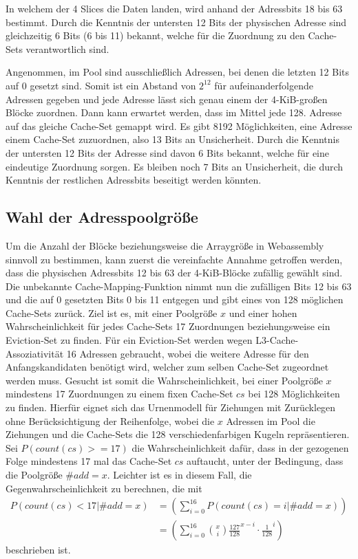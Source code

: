 In welchem der 4 Slices die Daten landen, wird anhand der Adressbits 18 bis 63 bestimmt.
Durch die Kenntnis der untersten 12 Bits der physischen Adresse sind gleichzeitig 6 Bits (6 bis 11) bekannt, welche für die Zuordnung zu den Cache-Sets verantwortlich sind.

Angenommen, im Pool sind ausschließlich Adressen, bei denen die letzten 12 Bits auf 0 gesetzt sind. 
Somit ist ein Abstand von $2^{12}$ für aufeinanderfolgende Adressen gegeben und jede Adresse lässt sich genau einem der 4-KiB-großen Blöcke zuordnen.
Dann kann erwartet werden, dass im Mittel jede 128. 
Adresse auf das gleiche Cache-Set gemappt wird. Es gibt 8192 Möglichkeiten, eine Adresse einem Cache-Set zuzuordnen, also 13 Bits an Unsicherheit.
Durch die Kenntnis der untersten 12 Bits der Adresse sind davon 6 Bits bekannt, welche für eine eindeutige Zuordnung sorgen. 
Es bleiben noch 7 Bits an Unsicherheit, die durch Kenntnis der restlichen Adressbits beseitigt werden könnten.

\subsection{Wahl der Adresspoolgröße}
\label{addressPoolSize}

Um die Anzahl der Blöcke beziehungsweise die Arraygröße in Webassembly sinnvoll zu bestimmen, kann zuerst die vereinfachte Annahme getroffen werden, dass die physischen Adressbits 12 bis 63 der 4-KiB-Blöcke zufällig gewählt sind. 
Die unbekannte Cache-Mapping-Funktion nimmt nun die zufälligen Bits 12 bis 63 und die auf 0 gesetzten Bits 0 bis 11 entgegen und gibt eines von 128 möglichen Cache-Sets zurück.
Ziel ist es, mit einer Poolgröße $x$ und einer hohen Wahrscheinlichkeit für jedes Cache-Sets 17 Zuordnungen beziehungsweise ein Eviction-Set zu finden.
Für ein Eviction-Set werden wegen L3-Cache-Assoziativität 16 Adressen gebraucht, wobei die weitere Adresse für den Anfangskandidaten benötigt wird, welcher zum selben Cache-Set zugeordnet werden muss.  
Gesucht ist somit die Wahrscheinlichkeit, bei einer Poolgröße $x$ mindestens 17 Zuordnungen zu einem fixen Cache-Set $cs$ bei 128 Möglichkeiten zu finden.
Hierfür eignet sich das Urnenmodell für Ziehungen mit Zurücklegen ohne Berücksichtigung der Reihenfolge, wobei die $x$ Adressen im Pool die Ziehungen und die Cache-Sets die 128 verschiedenfarbigen Kugeln repräsentieren. Sei $P(count(cs)>=17)$ die Wahrscheinlichkeit dafür, dass in der gezogenen Folge mindestens 17 mal das Cache-Set $cs$ auftaucht, unter der Bedingung, dass die Poolgröße $\#add = x$.
Leichter ist es in diesem Fall, die Gegenwahrscheinlichkeit zu berechnen, die mit
\begin{align*}
P(count(cs)<17|\#add = x) &=
\left( \sum\limits_{i=0}^{16}P(count(cs)=i|\#add = x) \right) \\&=
\left( \sum\limits_{i=0}^{16} {x \choose i} \frac{127}{128}^{x-i} \cdot \frac{1}{128}^i  \right)
\end{align*}
beschrieben ist.

